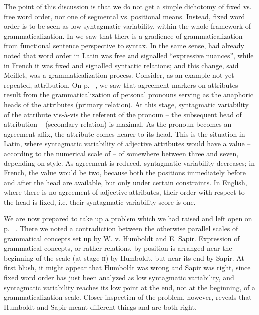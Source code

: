 The point of this discussion is that we do not get a simple dichotomy of fixed vs. free word order, nor one of segmental vs. positional means. Instead, fixed word order is to be seen as low syntagmatic variability, within the whole framework of grammaticalization. In  we saw that there is a gradience of grammaticalization from functional sentence perspective to syntax. In the same sense, \citet[147f]{Meillet1912} had already noted that word order in Latin was free and signalled “expressive nuances”, while in French it was fixed and signalled syntactic relations; and this change, said Meillet, was a grammaticalization process. Consider, as an example not yet repeated, attribution. On p.~\pageref{page77}\chk%
, we saw that agreement markers on attributes result from the grammaticalization of personal pronouns serving as the anaphoric heads of the attributes (primary relation). At this stage, syntagmatic variability of the attribute vis-à-vis the referent of the pronoun -- the subsequent head of attribution -- (secondary relation) is maximal. As the pronoun becomes an agreement affix, the attribute comes nearer to its head. This is the situation in Latin, where syntagmatic variability of adjective attributes would have a value -- according to the numerical scale of  -- of somewhere between three and seven, depending on style. As agreement is reduced, syntagmatic variability decreases; in French, the value would be two, because both the positions immediately before and after the head are available, but only under certain constraints. In English, where there is no agreement of adjective attributes, their order with respect to the head is fixed, i.e. their syntagmatic variability score is one.

We are now prepared to take up a problem which we had raised and left open on p.~\pageref{page6}\chk%
. There we noted a contradiction between the otherwise parallel scales of grammatical concepts set up by W. v. Humboldt and E. Sapir. Expression of grammatical concepts, or rather relations, by position is arranged near the beginning of the scale (at stage \textsc{ii}) by Humboldt, but near its end by Sapir. At first blush, it might appear that Humboldt was wrong and Sapir was right, since fixed word order has just been analyzed as low syntagmatic variability, and syntagmatic variability reaches its low point at the end, not at the beginning, of a grammaticalization scale. Closer inspection of the problem, however, reveals that Humboldt and Sapir meant different things and are both right.

